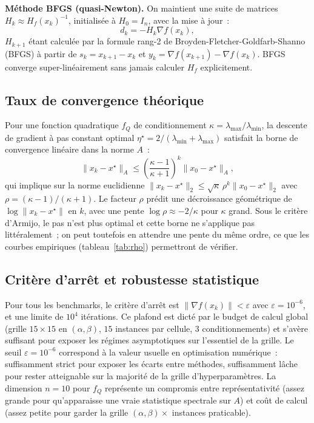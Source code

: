\documentclass[10pt,a4paper]{article}
\begin{document}
\textbf{Méthode BFGS (quasi-Newton).} On maintient une suite de matrices $H_k \approx H_f(x_k)^{-1}$, initialisée à $H_0 = I_n$, avec la mise à jour~:
\[
  d_k = -H_k \nabla f(x_k),
\]
$H_{k+1}$ étant calculée par la formule rang-2 de Broyden-Fletcher-Goldfarb-Shanno (BFGS) à partir de $s_k = x_{k+1}-x_k$ et $y_k = \nabla f(x_{k+1}) - \nabla f(x_k)$. BFGS converge super-linéairement sans jamais calculer $H_f$ explicitement.

\subsection{Taux de convergence théorique}\label{sec:taux}

Pour une fonction quadratique $f_Q$ de conditionnement $\kappa = \lambda_{\max}/\lambda_{\min}$, la descente de gradient à pas constant optimal $\eta^\star = 2/(\lambda_{\min} + \lambda_{\max})$ satisfait la borne de convergence linéaire dans la norme $A$~:
\[
  \|x_k - x^\star\|_A \leq \left(\frac{\kappa - 1}{\kappa + 1}\right)^k \|x_0 - x^\star\|_A,
\]
qui implique sur la norme euclidienne $\|x_k - x^\star\|_2 \leq \sqrt{\kappa}\,\rho^k \|x_0 - x^\star\|_2$ avec $\rho = (\kappa-1)/(\kappa+1)$. Le facteur $\rho$ prédit une décroissance géométrique de $\log\|x_k - x^\star\|$ en $k$, avec une pente $\log\rho \approx -2/\kappa$ pour $\kappa$ grand. Sous le critère d'Armijo, le pas n'est plus optimal et cette borne ne s'applique pas littéralement~; on peut toutefois en attendre une pente du même ordre, ce que les courbes empiriques (tableau~\ref{tab:rho}) permettront de vérifier.

\subsection{Critère d'arrêt et robustesse statistique}\label{sec:arret}

Pour tous les benchmarks, le critère d'arrêt est $\|\nabla f(x_k)\| < \varepsilon$ avec $\varepsilon = 10^{-6}$, et une limite de $10^4$ itérations. Ce plafond est dicté par le budget de calcul global (grille $15 \times 15$ en $(\alpha, \beta)$, $15$ instances par cellule, $3$ conditionnements) et s'avère suffisant pour exposer les régimes asymptotiques sur l'essentiel de la grille. Le seuil $\varepsilon = 10^{-6}$ correspond à la valeur usuelle en optimisation numérique~: suffisamment strict pour exposer les écarts entre méthodes, suffisamment lâche pour rester atteignable sur la majorité de la grille d'hyperparamètres. La dimension $n = 10$ pour $f_Q$ représente un compromis entre représentativité (assez grande pour qu'apparaisse une vraie statistique spectrale sur $A$) et coût de calcul (assez petite pour garder la grille $(\alpha, \beta) \times$ instances praticable).
\end{document}
